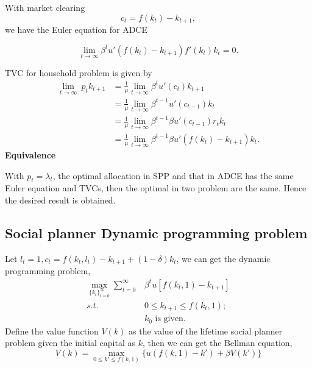 \documentclass[12pt,notitlepage]{article}%
\numberwithin{equation}{section}
\begin{document}
			With market clearing 
			\begin{equation*}
			c_t=f(k_t)-k_{t+1},
			\end{equation*}
			we have the Euler equation for ADCE
			
			\begin{equation}\label{EularADCE}
			\lim_{t\to \infty}\beta^t u'(f(k_t)-k_{t+1})f'(k_t)k_t=0.
			\end{equation}
			
			TVC for household problem is given by 
			\begin{equation}\label{TVCADCE}
			\begin{split}
			\lim_{t\to \infty}\ p_tk_{t+1}&=\frac{1}{\mu}\lim_{t\to \infty}\beta^tu'(c_t)k_{t+1}\\
			&=\frac{1}{\mu}\lim_{t\to \infty}\beta^{t-1}u'(c_{t-1})k_{t}\\
			&=\frac{1}{\mu}\lim_{t\to \infty}\beta^{t-1}\beta u'(c_{t-1})r_tk_{t}\\
			&=\frac{1}{\mu}\lim_{t\to \infty}\beta^{t-1}\beta u'(f(k_t)-k_{t+1})k_{t}.
			\end{split}
			\end{equation}
			\textbf{Equivalence}
			
			With $p_t=\lambda_t$, the optimal allocation in  SPP and that in ADCE has the same Euler equation and TVCs, then the optimal in two problem are the same. Hence the desired result is obtained.

		\subsection{Social planner Dynamic programming problem}
			Let $l_t=1, c_t=f(k_t,l_t)-k_{t+1}+(1-\delta)k_t$, we can get the dynamic programming problem,
			\begin{equation*}
			\begin{split}
				\max_{\{k_t\}_{t=0}^{\infty}}\sum_{t=0}^{\infty}&\beta^tu[f(k_t,1)-k_{t+1}]\\
				s.t.\;\;&0\leq k_{t+1}\leq f(k_t,1);\\
				&k_0 \text{ is given.}
			\end{split}
			\end{equation*}
			Define the value function $V(k)$ as the value of the lifetime social planner problem given the initial capital as $k$, then we can get the Bellman equation,
			\begin{equation*}
				V(k)=\max_{0\leq k'\leq f(k,1)} \{u(f(k,1)-k')+\beta V(k')\}
			\end{equation*}
			
\end{document}
